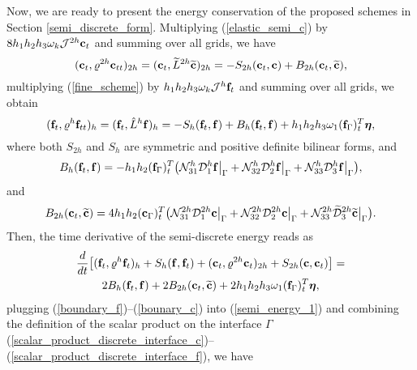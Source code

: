  Now, we are ready to present the energy conservation of the proposed schemes in Section \ref{semi_discrete_form}. Multiplying (\ref{elastic_semi_c}) by $8h_1h_2h_3\omega_k{\mathcal J}^{2h}{\bf c}_t$ and summing over all grids, we have
\begin{equation}\label{coarse_simple}
({\bf c}_t, {\varrho}^{2h}{\bf c}_{tt})_{2h} = ({\bf c}_t,\wt{L}^{2h}\wt{{\bf c}})_{2h} = -S_{2h}({\bf c}_t,{\bf c}) + B_{2h}({\bf c}_t,\wt{{\bf c}}),
\end{equation}
multiplying (\ref{fine_scheme}) by $h_1h_2h_3\omega_k{\mathcal J}^h{\bf f}_t$ and summing over all grids, we obtain
\begin{equation*}
({\bf f}_t, {\varrho}^h{\bf f}_{tt})_h = ({\bf f}_t,\hat{L}^h{\bf f})_h = -S_h({\bf f}_t,{\bf f}) + B_h({\bf f}_t,{\bf f}) 
+h_1h_2h_3\omega_1({\bf f}_\Gamma)_t^T{\bm \eta},
\end{equation*}
where  both $S_{2h}$ and $S_h$ are symmetric and positive definite bilinear forms, and 
\begin{equation}\label{boundary_f}
B_h ({\bf f}_t,{\bf f}) = -h_1h_2({\bf f}_{\Gamma})_t^T\big(\mathcal{N}_{31}^h{\mathcal D}_1^h {\bf f}\big|_{\Gamma}+ \mathcal{N}_{32}^h\mathcal{D}_2^h{\bf f}\big|_{\Gamma}+\mathcal{N}_{33}^h\mathcal{D}_3^h{\bf f}\big|_{\Gamma}\big),
\end{equation}
and
\begin{equation}\label{bounary_c}
B_{2h} ({\bf c}_t,\wt{\bf c}) = 4h_1h_2({\bf c}_{\Gamma})_t^T\big(\mathcal{N}_{31}^{2h}\mathcal{D}_1^{2h}{\bf c}\big|_{\Gamma}+ \mathcal{N}_{32}^{2h}\mathcal{D}_2^{2h}{\bf c}\big|_{\Gamma}+\mathcal{N}_{33}^{2h}\wt{\mathcal{D}}_3^{2h}\wt{{\bf c}}\big|_{\Gamma}\big).
\end{equation}
Then, the time derivative of the semi-discrete energy reads as
\begin{multline}\label{semi_energy_1}
\frac{d}{dt}\big[({\bf f}_t,\varrho^h {\bf f}_t)_h + S_h({\bf f},{\bf f}_t) + ({\bf c}_t,\varrho^{2h} {\bf c}_t)_{2h} + S_{2h}({\bf c},{\bf c}_t) \big]  = \\
2B_{h}({\bf f}_t,{\bf f}) + 2B_{2h}({\bf c}_t,\wt{\bf c}) + 2h_1h_2h_3\omega_1({\bf f}_\Gamma)_t^T{\bm \eta},
\end{multline}
plugging (\ref{boundary_f})--(\ref{bounary_c}) into (\ref{semi_energy_1}) and combining the definition of the scalar product on the interface $\Gamma$ (\ref{scalar_product_discrete_interface_c})--(\ref{scalar_product_discrete_interface_f}), we have
